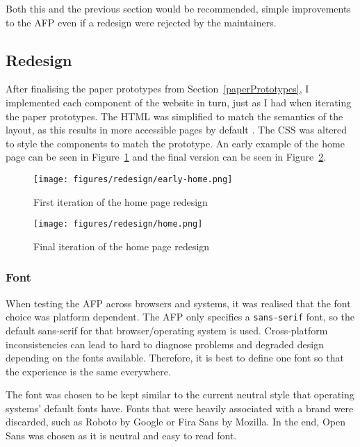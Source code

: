 \documentclass[bsc,frontabs,oneside,singlespacing,parskip,deptreport,logo]{infthesis}
\newcommand{\jtodo}[2][]{\todo[color=yellow!70,#1]{\footnotesize JF: #2}}
\newcommand{\cit}{\jtodo{Citation needed.}}
\begin{document}
Both this and the previous section would be recommended, simple improvements to the AFP even if a redesign were rejected by the maintainers.

\subsection{Redesign}

After finalising the paper prototypes from Section~\ref{paperPrototypes}, I implemented each component of the website in turn, just as I had when iterating the paper prototypes. The HTML was simplified to match the semantics of the layout, as this results in more accessible pages by default \cit{}. The CSS was altered to style the components to match the prototype. An early example of the home page can be seen in Figure~\ref{home-early} and the final version can be seen in Figure~\ref{home-final}.

\begin{figure}[h]
    \centering
    \texttt{[image: figures/redesign/early-home.png]}
    \caption{First iteration of the home page redesign}
    \label{home-early}
\end{figure}

\begin{figure}[h]
    \centering
    \texttt{[image: figures/redesign/home.png]}
    \caption{Final iteration of the home page redesign}
    \label{home-final}
\end{figure}

\subsubsection{Font}

When testing the AFP across browsers and systems, it was realised that the font choice was platform dependent. The AFP only specifies a \verb|sans-serif| font, so the default sans-serif for that browser/operating system is used. Cross-platform inconsistencies can lead to hard to diagnose problems and degraded design depending on the fonts available. Therefore, it is best to define one font so that the experience is the same everywhere. 

\cbstart
The font was chosen to be kept similar to the current neutral style that operating systems' default  fonts have. Fonts that were heavily associated with a brand were discarded, such as Roboto by Google or Fira Sans by Mozilla. In the end, Open Sans was chosen as it is neutral and easy to read font. \cbend
\end{document}
